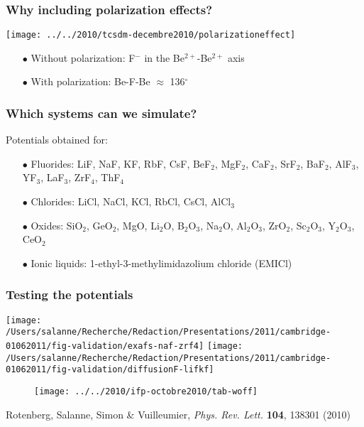 \documentclass{beamer}
\begin{document}
\begin{frame}
   \frametitle{Why including polarization effects?}
   \begin{center}
   \texttt{[image: ../../2010/tcsdm-decembre2010/polarizationeffect]}
   \end{center}
   \begin{itemize}
      \item[$\bullet$] Without polarization: F$^{-}$ in the Be$^{2+}$-Be$^{2+}$ axis
      \item[$\bullet$] With polarization: Be-F-Be $\approx$ 136$^\circ$
   \end{itemize}
\end{frame}

\begin{frame}
   \frametitle{Which systems can we simulate?}
   Potentials obtained for:
      \vspace{0.3cm}
   \begin{itemize}
      \item[$\bullet$] Fluorides: LiF, NaF, KF, RbF, CsF, BeF$_2$, MgF$_2$, CaF$_2$, SrF$_2$, BaF$_2$, AlF$_3$, YF$_3$, LaF$_3$, ZrF$_4$, ThF$_4$
      \vspace{0.3cm}
      \item[$\bullet$] Chlorides: LiCl, NaCl, KCl, RbCl, CsCl, AlCl$_3$
      \vspace{0.3cm}
      \item[$\bullet$] Oxides: SiO$_2$, GeO$_2$, MgO, Li$_2$O, B$_2$O$_3$, Na$_2$O, Al$_2$O$_3$, ZrO$_2$, Sc$_2$O$_3$, Y$_2$O$_3$, CeO$_2$
      \vspace{0.3cm}
      \item[$\bullet$] Ionic liquids: 1-ethyl-3-methylimidazolium chloride (EMICl)
   \end{itemize}
\end{frame}


\begin{frame}
   \frametitle{Testing the potentials}
            \vspace{-0.29cm}
            \begin{center}
            \texttt{[image: /Users/salanne/Recherche/Redaction/Presentations/2011/cambridge-01062011/fig-validation/exafs-naf-zrf4]} \texttt{[image: /Users/salanne/Recherche/Redaction/Presentations/2011/cambridge-01062011/fig-validation/diffusionF-lifkf]} 
            \end{center}
   \vspace{-0.5cm}
   \begin{figure}
      \texttt{[image: ../../2010/ifp-octobre2010/tab-woff]}
   \end{figure}
{\scriptsize  Rotenberg, Salanne, Simon \& Vuilleumier, {\it Phys. Rev. Lett.} {\bf 104}, 138301 (2010)}
\end{frame}
\end{document}
